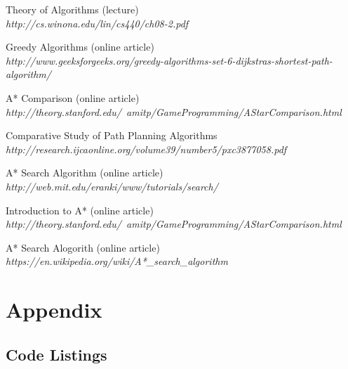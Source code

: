 \documentclass[11pt, a4paper]{article}
\begin{document}
\begin{thebibliography}{}
\par{Theory of Algorithms (lecture)}
\\
\textit{http://cs.winona.edu/lin/cs440/ch08-2.pdf}

\par{Greedy Algorithms (online article)}
\\
\textit{http://www.geeksforgeeks.org/greedy-algorithms-set-6-dijkstras-shortest-path-algorithm/}

\par{A* Comparison (online article)}
\\
\textit{http://theory.stanford.edu/~amitp/GameProgramming/AStarComparison.html}

\par{Comparative Study of Path Planning Algorithms}
\\
\textit{http://research.ijcaonline.org/volume39/number5/pxc3877058.pdf}

\par{A* Search Algorithm (online article)}
\\
\textit{http://web.mit.edu/eranki/www/tutorials/search/}



\par{Introduction to A* (online article)}
\\
\textit{http://theory.stanford.edu/~amitp/GameProgramming/AStarComparison.html}



\par{A* Search Alogorith (online article)}
\\
\textit{https://en.wikipedia.org/wiki/A*\_search\_algorithm}




\end{thebibliography}

\newpage
\section*{Appendix}
\subsection{Code Listings}
\label{Code}
















\end{document}
